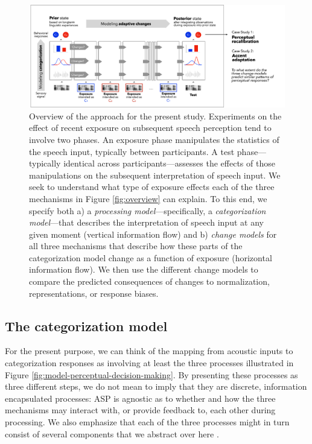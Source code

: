 \documentclass[
  11pt,
  man,floatsintext]{apa6}
\begin{document}
\begin{figure}[h]
\begin{center}
\includegraphics[width=.99\columnwidth]{../figures/diagrams/overview-of-changes.png}
\caption{Overview of the approach for the present study. Experiments on the effect of recent exposure on subsequent speech perception tend to involve two phases. An exposure phase manipulates the statistics of the speech input, typically between participants. A test phase---typically identical across participants---assesses the effects of those manipulations on the subsequent interpretation of speech input. We seek to understand what type of exposure effects each of the three mechanisms in Figure \ref{fig:overview} can explain. To this end, we specify both a) a {\em processing model}---specifically, a {\em categorization model}---that describes the interpretation of speech input at any given moment (vertical information flow) and b) {\em change models} for all three mechanisms that describe how these parts of the categorization model change as a function of exposure (horizontal information flow). We then use the different change models to compare the predicted consequences of changes to normalization, representations, or response biases.}\label{fig:overview-change}
\end{center}
\end{figure}

\hypertarget{the-categorization-model}{%
\subsection{The categorization model}\label{the-categorization-model}}

For the present purpose, we can think of the mapping from acoustic inputs to categorization responses as involving at least the three processes illustrated in Figure \ref{fig:model-perceptual-decision-making}. By presenting these processes as three different steps, we do not mean to imply that they are discrete, information encapsulated processes: ASP is agnostic as to whether and how the three mechanisms may interact with, or provide feedback to, each other during processing. We also emphasize that each of the three processes might in turn consist of several components that we abstract over here \autocite[e.g., multiple different levels of normalization, cf.~discussion in][]{barreda2020}.
\end{document}
